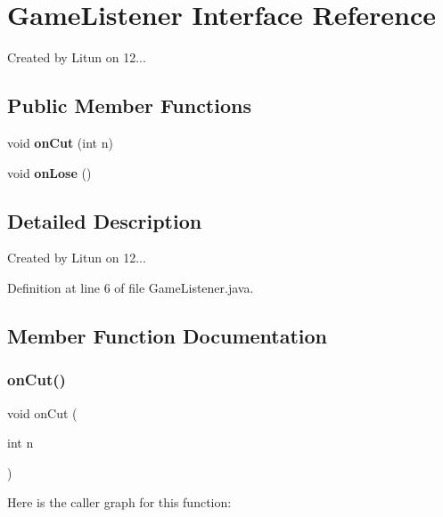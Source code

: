 \section{Game\+Listener Interface Reference}
\label{interfacesf_1_1unitingtwist_1_1_game_listener}


Created by Litun on 12...  


\subsection*{Public Member Functions}
\begin{DoxyCompactItemize}
\item 
void \textbf{ on\+Cut} (int n)
\item 
void \textbf{ on\+Lose} ()
\end{DoxyCompactItemize}


\subsection{Detailed Description}
Created by Litun on 12... 

Definition at line 6 of file Game\+Listener.\+java.



\subsection{Member Function Documentation}
\mbox{\label{interfacesf_1_1unitingtwist_1_1_game_listener_ac9f99a8933b01d99f8e7b23f4f871a23}} 
\subsubsection{on\+Cut()}
{\footnotesize\ttfamily void on\+Cut (\begin{DoxyParamCaption}\item[{int}]{n }\end{DoxyParamCaption})}

Here is the caller graph for this function\+:
\mbox{\label{interfacesf_1_1unitingtwist_1_1_game_listener_ad3a588cbd6aa6344ad9a032223571669}} 
